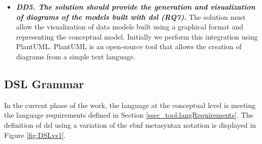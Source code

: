 \begin{itemize}
    \item\textit{\textbf{DD5. The solution should provide the generation and visualization of diagrams of the models built with \ac{dsl} (RQ7).}}
    The solution must allow the visualization of data models built using a graphical format and representing the conceptual model.
    Initially we perform this integration using PlantUML.
    PlantUML is an open-source tool that allows the creation of diagrams from a simple text language.
\end{itemize}


\subsection{DSL Grammar} \label{ssec_tool:grammar}

In the current phase of the work, the language at the conceptual level is meeting the language requirements defined in Section \ref{ssec_tool:langRequirements}.
The definition of \ac{dsl} using a variation of the \ac{ebnf} metasyntax notation is displayed in Figure \autoref{fig:DSLvs1}.


